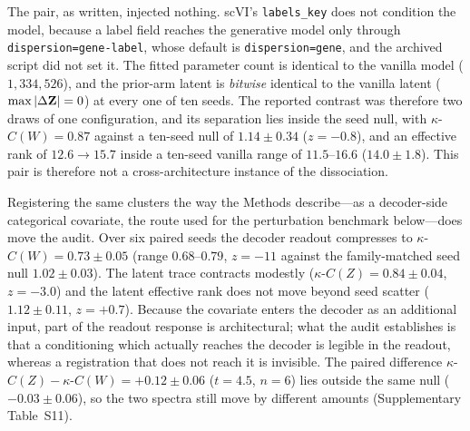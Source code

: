 \documentclass[11 pt,a4 paper]{article}
\begin{document}
The pair, as written, injected nothing. scVI's \texttt{labels\_key} does not condition the model, because a label field reaches the generative model only through \texttt{dispersion=gene-label}, whose default is \texttt{dispersion=gene}, and the archived script did not set it. The fitted parameter count is identical to the vanilla model ($1{,}334{,}526$), and the prior-arm latent is \emph{bitwise} identical to the vanilla latent ($\max|\Delta\mathbf{Z}|=0$) at every one of ten seeds. The reported contrast was therefore two draws of one configuration, and its separation lies inside the seed null, with $\kappa$-$C(W)=0.87$ against a ten-seed null of $1.14\pm0.34$ ($z=-0.8$), and an effective rank of $12.6\to15.7$ inside a ten-seed vanilla range of $11.5$--$16.6$ ($14.0\pm1.8$). This pair is therefore not a cross-architecture instance of the dissociation.

Registering the same clusters the way the Methods describe---as a decoder-side categorical covariate, the route used for the perturbation benchmark below---does move the audit. Over six paired seeds the decoder readout compresses to $\kappa$-$C(W)=0.73\pm0.05$ (range $0.68$--$0.79$, $z=-11$ against the family-matched seed null $1.02\pm0.03$). The latent trace contracts modestly ($\kappa$-$C(Z)=0.84\pm0.04$, $z=-3.0$) and the latent effective rank does not move beyond seed scatter ($1.12\pm0.11$, $z=+0.7$). Because the covariate enters the decoder as an additional input, part of the readout response is architectural; what the audit establishes is that a conditioning which actually reaches the decoder is legible in the readout, whereas a registration that does not reach it is invisible. The paired difference $\kappa$-$C(Z)-\kappa$-$C(W)=+0.12\pm0.06$ ($t=4.5$, $n=6$) lies outside the same null ($-0.03\pm0.06$), so the two spectra still move by different amounts (Supplementary Table~S11).
\end{document}
